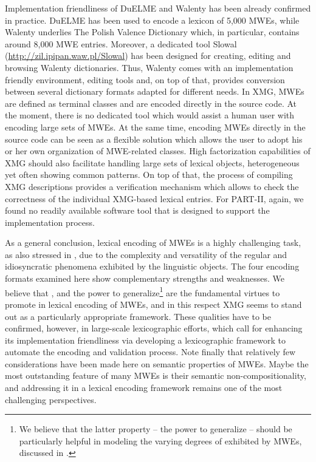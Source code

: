\documentclass[output=paper]{langsci/langscibook}
\begin{document}
Implementation friendliness of DuELME and Walenty has been already confirmed in practice. DuELME has been used to encode a lexicon of 5,000  MWEs, while Walenty underlies The Polish Valence Dictionary which, in particular, contains around 8,000 MWE entries. Moreover, a dedicated tool Slowal (\url{http://zil.ipipan.waw.pl/Slowal}) has been designed for creating, editing and browsing Walenty dictionaries. Thus, Walenty comes with an implementation friendly environment, editing tools and, on top of that, provides conversion between several dictionary formats adapted for different needs. In XMG, MWEs are defined as terminal classes and are encoded directly in the source code. At the moment, there is no dedicated tool which would assist a human user with encoding large sets of MWEs. At the same time, encoding MWEs directly in the source code can be seen as a flexible solution which allows the user to adopt his or her own organization of MWE-related classes. High factorization capabilities of XMG should also facilitate handling large sets of lexical objects, heterogeneous yet often showing common patterns. On top of that, the process of compiling XMG descriptions provides a verification mechanism which allows to check the correctness of the individual XMG-based lexical entries. For PART-II, again, we found no readily available software tool that is designed to support the implementation process. 

As a general conclusion, lexical encoding of MWEs is a highly challenging task, as also stressed in , due to the complexity and versatility of the regular and idiosyncratic phenomena exhibited by the linguistic objects. The four encoding formats examined here show complementary strengths and weaknesses. We believe that ,  and the power to generalize\footnote{We believe that the latter property -- the power to generalize -- should be particularly helpful in modeling the varying degrees of  exhibited by MWEs, discussed in .} are the fundamental virtues to promote in lexical encoding of MWEs, and in this respect XMG seems to stand out as a particularly appropriate framework. These qualities have to be confirmed, however, in large-scale lexicographic efforts, which call for enhancing its implementation friendliness via developing a lexicographic framework to automate the encoding and validation process. Note finally that relatively few considerations have been made here on semantic properties of MWEs. Maybe the most outstanding feature of many MWEs is their semantic non-compositionality, and addressing it in a lexical encoding framework remains one of the most challenging perspectives.
 
\end{document}
